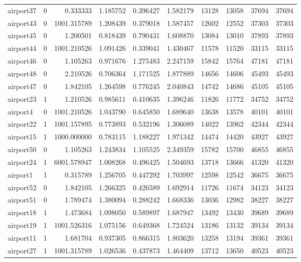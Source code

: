 \begin{longtable}{|l|r|r|r|r|r|r|r|r|r|}
airport37 & 0 & 0.333333 & 1.185752 & 0.396427 & 1.582179 & 13128 & 13058 & 37694 & 37694 \\
airport43 & 0 & 1001.315789 & 1.208439 & 0.379018 & 1.587457 & 12602 & 12552 & 37303 & 37303 \\
airport45 & 0 & 1.200501 & 0.818439 & 0.790431 & 1.608870 & 13084 & 13010 & 37893 & 37893 \\
airport44 & 0 & 1001.210526 & 1.091426 & 0.339041 & 1.430467 & 11578 & 11520 & 33115 & 33115 \\
airport46 & 0 & 1.105263 & 0.971676 & 1.275483 & 2.247159 & 15842 & 15764 & 47181 & 47181 \\
airport48 & 0 & 2.210526 & 0.706364 & 1.171525 & 1.877889 & 14656 & 14606 & 45493 & 45493 \\
airport47 & 0 & 1.842105 & 1.264598 & 0.776245 & 2.040843 & 14742 & 14686 & 45105 & 45105 \\
airport23 & 1 & 1.210526 & 0.985611 & 0.410635 & 1.396246 & 11826 & 11772 & 34752 & 34752 \\
airport4 & 0 & 1001.210526 & 1.043790 & 0.645850 & 1.689640 & 13638 & 13578 & 40101 & 40101 \\
airport22 & 1 & 1001.157895 & 0.773893 & 0.532196 & 1.306089 & 14022 & 13962 & 42344 & 42344 \\
airport15 & 1 & 1000.000000 & 0.783115 & 1.188227 & 1.971342 & 14474 & 14420 & 43927 & 43927 \\
airport50 & 0 & 1.105263 & 1.243834 & 1.105525 & 2.349359 & 15782 & 15700 & 46855 & 46855 \\
airport24 & 1 & 6001.578947 & 1.008268 & 0.496425 & 1.504693 & 13718 & 13666 & 41320 & 41320 \\
airport1 & 1 & 0.315789 & 1.256705 & 0.447292 & 1.703997 & 12598 & 12542 & 36675 & 36675 \\
airport52 & 0 & 1.842105 & 1.266325 & 0.426589 & 1.692914 & 11726 & 11674 & 34123 & 34123 \\
airport51 & 0 & 1.789474 & 1.380094 & 0.288242 & 1.668336 & 13036 & 12982 & 38227 & 38227 \\
airport18 & 1 & 1.473684 & 1.098050 & 0.589897 & 1.687947 & 13492 & 13430 & 39689 & 39689 \\
airport19 & 1 & 1001.526316 & 1.075156 & 0.649368 & 1.724524 & 13186 & 13132 & 39134 & 39134 \\
airport11 & 1 & 1.681704 & 0.937305 & 0.866315 & 1.803620 & 13258 & 13194 & 39361 & 39361 \\
airport27 & 1 & 1001.315789 & 1.026536 & 0.437873 & 1.464409 & 13712 & 13650 & 40523 & 40523 \\

\end{longtable}
